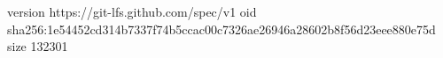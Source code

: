 version https://git-lfs.github.com/spec/v1
oid sha256:1e54452cd314b7337f74b5ccac00c7326ae26946a28602b8f56d23eee880e75d
size 132301
